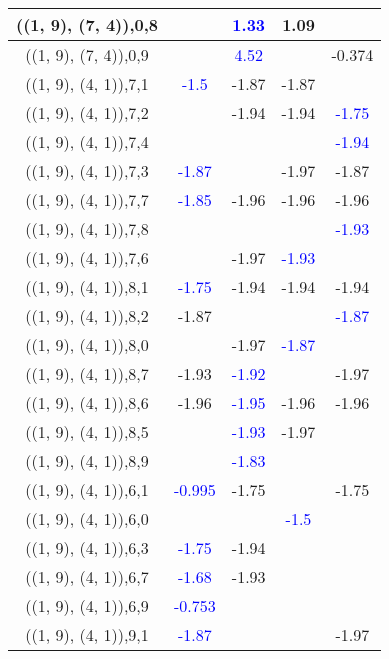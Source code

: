 \documentclass{article}
\begin{document}
\begin{center}
\begin{longtable}{|c|c|c|c|c|}
        	\hline
        	((1, 9), (7, 4)),0,8&& \textcolor{blue}{1.33}&1.09&\\
        	\hline
        	((1, 9), (7, 4)),0,9&& \textcolor{blue}{4.52}&&-0.374\\
        	\hline
        	((1, 9), (4, 1)),7,1& \textcolor{blue}{-1.5}&-1.87&-1.87&\\
        	\hline
        	((1, 9), (4, 1)),7,2&&-1.94&-1.94& \textcolor{blue}{-1.75}\\
        	\hline
        	((1, 9), (4, 1)),7,4&&&& \textcolor{blue}{-1.94}\\
        	\hline
        	((1, 9), (4, 1)),7,3& \textcolor{blue}{-1.87}&&-1.97&-1.87\\
        	\hline
        	((1, 9), (4, 1)),7,7& \textcolor{blue}{-1.85}&-1.96&-1.96&-1.96\\
        	\hline
        	((1, 9), (4, 1)),7,8&&&& \textcolor{blue}{-1.93}\\
        	\hline
        	((1, 9), (4, 1)),7,6&&-1.97& \textcolor{blue}{-1.93}&\\
        	\hline
        	((1, 9), (4, 1)),8,1& \textcolor{blue}{-1.75}&-1.94&-1.94&-1.94\\
        	\hline
        	((1, 9), (4, 1)),8,2&-1.87&&& \textcolor{blue}{-1.87}\\
        	\hline
        	((1, 9), (4, 1)),8,0&&-1.97& \textcolor{blue}{-1.87}&\\
        	\hline
        	((1, 9), (4, 1)),8,7&-1.93& \textcolor{blue}{-1.92}&&-1.97\\
        	\hline
        	((1, 9), (4, 1)),8,6&-1.96& \textcolor{blue}{-1.95}&-1.96&-1.96\\
        	\hline
        	((1, 9), (4, 1)),8,5&& \textcolor{blue}{-1.93}&-1.97&\\
        	\hline
        	((1, 9), (4, 1)),8,9&& \textcolor{blue}{-1.83}&&\\
        	\hline
        	((1, 9), (4, 1)),6,1& \textcolor{blue}{-0.995}&-1.75&&-1.75\\
        	\hline
        	((1, 9), (4, 1)),6,0&&& \textcolor{blue}{-1.5}&\\
        	\hline
        	((1, 9), (4, 1)),6,3& \textcolor{blue}{-1.75}&-1.94&&\\
        	\hline
        	((1, 9), (4, 1)),6,7& \textcolor{blue}{-1.68}&-1.93&&\\
        	\hline
        	((1, 9), (4, 1)),6,9& \textcolor{blue}{-0.753}&&&\\
        	\hline
        	((1, 9), (4, 1)),9,1& \textcolor{blue}{-1.87}&&&-1.97\\

\end{longtable}
\end{center}
\end{document}
